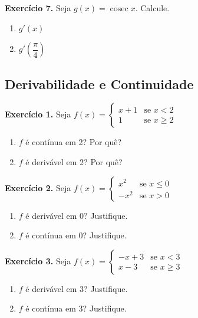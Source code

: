 \documentclass[12pt,a4paper]{article}
\begin{document}
\vspace{0.5cm}
\noindent\textbf{Exercício 7.} Seja $g(x) = \operatorname{cosec} x$. Calcule.
\begin{enumerate}
    \renewcommand{\theenumi}{\alph{enumi}}
    \renewcommand{\labelenumi}{\theenumi)}
    \item $g'(x)$
    \item $g'\!\left(\dfrac{\pi}{4}\right)$
\end{enumerate}

\subsection{Derivabilidade e Continuidade}
\vspace{0.5cm}
\noindent\textbf{Exercício 1.} Seja $f(x) = \begin{cases} x + 1 & \text{se } x < 2 \\ 1 & \text{se } x \ge 2 \end{cases}$
\begin{enumerate}
    \renewcommand{\theenumi}{\alph{enumi}}
    \renewcommand{\labelenumi}{\theenumi)}
    \item $f$ é contínua em 2? Por quê?
    \item $f$ é derivável em 2? Por quê?
\end{enumerate}

\vspace{0.5cm}
\noindent\textbf{Exercício 2.} Seja $f(x) = \begin{cases} x^2 & \text{se } x \le 0 \\ -x^2 & \text{se } x > 0 \end{cases}$
\begin{enumerate}
    \renewcommand{\theenumi}{\alph{enumi}}
    \renewcommand{\labelenumi}{\theenumi)}
    \item $f$ é derivável em 0? Justifique.
    \item $f$ é contínua em 0? Justifique.
\end{enumerate}

\vspace{0.5cm}
\noindent\textbf{Exercício 3.} Seja $f(x) = \begin{cases} -x + 3 & \text{se } x < 3 \\ x - 3 & \text{se } x \ge 3 \end{cases}$
\begin{enumerate}
    \renewcommand{\theenumi}{\alph{enumi}}
    \renewcommand{\labelenumi}{\theenumi)}
    \item $f$ é derivável em 3? Justifique.
    \item $f$ é contínua em 3? Justifique.
\end{enumerate}
\end{document}
